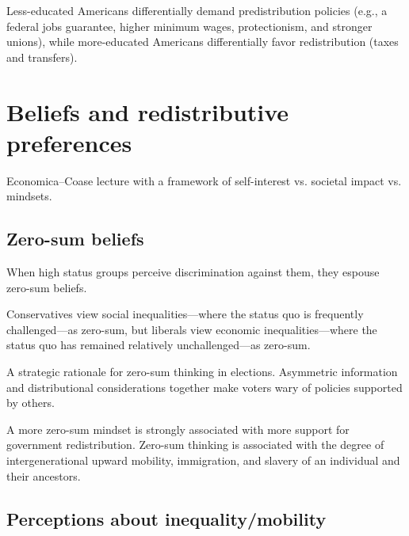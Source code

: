 \documentclass{article}
\newcommand{\citem}[1]{\medskip \noindent \textbf{\cite*{#1}}}
\begin{document}
\citem{kuziemko2023compensate}

Less-educated Americans differentially demand predistribution policies (e.g., a federal jobs guarantee, higher minimum wages, protectionism, and stronger unions), while more-educated Americans differentially favor redistribution (taxes and transfers).





\section{Beliefs and redistributive preferences}

\citem{stantcheva2026perceptions}

Economica--Coase lecture with a framework of self-interest vs. societal impact vs. mindsets.

\subsection{Zero-sum beliefs}

\citem{wilkins2015you}

When high status groups perceive discrimination against them, they espouse zero-sum beliefs.

\citem{davidai2019politics}

Conservatives view social inequalities---where the status quo is frequently challenged---as zero-sum, but liberals view economic inequalities---where the status quo has remained relatively unchallenged---as zero-sum.

\citem{ali2025political}

A strategic rationale for zero-sum thinking in elections. Asymmetric information and distributional considerations together make voters wary of policies supported by others.

\citem{chinoy2026zero}

A more zero-sum mindset is strongly associated with more support for government redistribution. Zero-sum thinking is associated with the degree of intergenerational upward mobility, immigration, and slavery of an individual and their ancestors.

\subsection{Perceptions about inequality/mobility}

\citem{kenworthy2007inequality}
\end{document}
